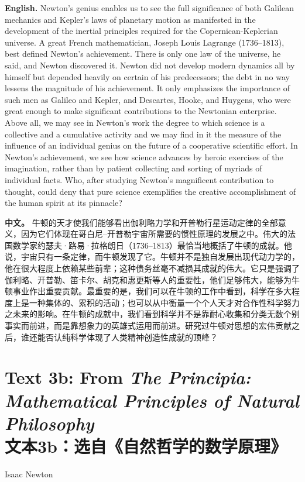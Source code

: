 \noindent\textbf{English.} Newton's genius enables us to see the full significance of both Galilean mechanics and Kepler's laws of planetary motion as manifested in the development of the inertial principles required for the Copernican-Keplerian universe. A great French mathematician, Joseph Louis Lagrange (1736--1813), best defined Newton's achievement. There is only one law of the universe, he said, and Newton discovered it. Newton did not develop modern dynamics all by himself but depended heavily on certain of his predecessors; the debt in no way lessens the magnitude of his achievement. It only emphasizes the importance of such men as Galileo and Kepler, and Descartes, Hooke, and Huygens, who were great enough to make significant contributions to the Newtonian enterprise. Above all, we may see in Newton's work the degree to which science is a collective and a cumulative activity and we may find in it the measure of the influence of an individual genius on the future of a cooperative scientific effort. In Newton's achievement, we see how science advances by heroic exercises of the imagination, rather than by patient collecting and sorting of myriads of individual facts. Who, after studying Newton's magnificent contribution to thought, could deny that pure science exemplifies the creative accomplishment of the human spirit at its pinnacle?
\par\noindent\textbf{中文。} 牛顿的天才使我们能够看出伽利略力学和开普勒行星运动定律的全部意义，因为它们体现在哥白尼--开普勒宇宙所需要的惯性原理的发展之中。伟大的法国数学家约瑟夫·路易·拉格朗日（1736--1813）最恰当地概括了牛顿的成就。他说，宇宙只有一条定律，而牛顿发现了它。牛顿并不是独自发展出现代动力学的，他在很大程度上依赖某些前辈；这种债务丝毫不减损其成就的伟大。它只是强调了伽利略、开普勒、笛卡尔、胡克和惠更斯等人的重要性，他们足够伟大，能够为牛顿事业作出重要贡献。最重要的是，我们可以在牛顿的工作中看到，科学在多大程度上是一种集体的、累积的活动；也可以从中衡量一个个人天才对合作性科学努力之未来的影响。在牛顿的成就中，我们看到科学并不是靠耐心收集和分类无数个别事实而前进，而是靠想象力的英雄式运用而前进。研究过牛顿对思想的宏伟贡献之后，谁还能否认纯科学体现了人类精神创造性成就的顶峰？
\medskip

\section*{Text 3b: From \emph{The Principia: Mathematical Principles of Natural Philosophy}\\文本3b：选自《自然哲学的数学原理》}
\begin{flushright}
Isaac Newton
\end{flushright}

